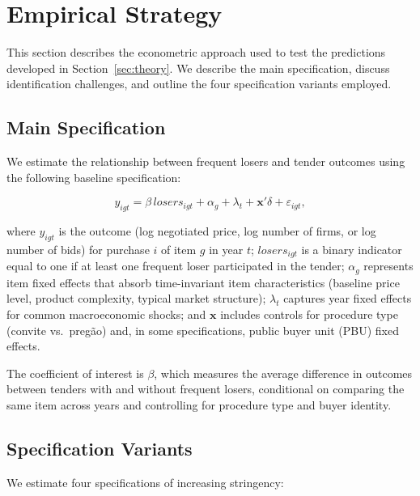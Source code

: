 \section{Empirical Strategy}
\label{sec:empirical_strategy}

This section describes the econometric approach used to test the predictions developed in Section~\ref{sec:theory}. We describe the main specification, discuss identification challenges, and outline the four specification variants employed.

\subsection{Main Specification}

We estimate the relationship between frequent losers and tender outcomes using the following baseline specification:

\begin{equation}
  y_{igt} = \beta \, \textit{losers}_{igt} + \alpha_g + \lambda_t + \mathbf{x}'\delta + \varepsilon_{igt},
  \label{eq:main}
\end{equation}

\noindent where $y_{igt}$ is the outcome (log negotiated price, log number of firms, or log number of bids) for purchase $i$ of item $g$ in year $t$; $\textit{losers}_{igt}$ is a binary indicator equal to one if at least one frequent loser participated in the tender; $\alpha_g$ represents item fixed effects that absorb time-invariant item characteristics (baseline price level, product complexity, typical market structure); $\lambda_t$ captures year fixed effects for common macroeconomic shocks; and $\mathbf{x}$ includes controls for procedure type (convite vs.\ preg\~{a}o) and, in some specifications, public buyer unit (PBU) fixed effects.

The coefficient of interest is $\beta$, which measures the average difference in outcomes between tenders with and without frequent losers, conditional on comparing the same item across years and controlling for procedure type and buyer identity.

\subsection{Specification Variants}

We estimate four specifications of increasing stringency:

